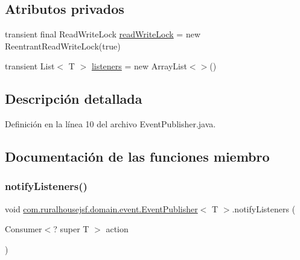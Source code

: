 \subsection*{Atributos privados}
\begin{DoxyCompactItemize}
\item 
transient final Read\+Write\+Lock \mbox{\hyperlink{classcom_1_1ruralhousejsf_1_1domain_1_1event_1_1_event_publisher_a5fc44b6d9dfee072080a75909bc6ac8d}{read\+Write\+Lock}} = new Reentrant\+Read\+Write\+Lock(true)
\item 
transient List$<$ T $>$ \mbox{\hyperlink{classcom_1_1ruralhousejsf_1_1domain_1_1event_1_1_event_publisher_a7d451510f2e915561f219dd4e07eeed6}{listeners}} = new Array\+List$<$$>$()
\end{DoxyCompactItemize}


\subsection{Descripción detallada}


Definición en la línea 10 del archivo Event\+Publisher.\+java.



\subsection{Documentación de las funciones miembro}
\mbox{\label{classcom_1_1ruralhousejsf_1_1domain_1_1event_1_1_event_publisher_a7bd776be1bff02b358cfae8b22f33b73}} 
\subsubsection{\texorpdfstring{notifyListeners()}{notifyListeners()}}
{\footnotesize\ttfamily void \mbox{\hyperlink{classcom_1_1ruralhousejsf_1_1domain_1_1event_1_1_event_publisher}{com.\+ruralhousejsf.\+domain.\+event.\+Event\+Publisher}}$<$ T $>$.notify\+Listeners (\begin{DoxyParamCaption}\item[{Consumer$<$? super T $>$}]{action }\end{DoxyParamCaption})}



